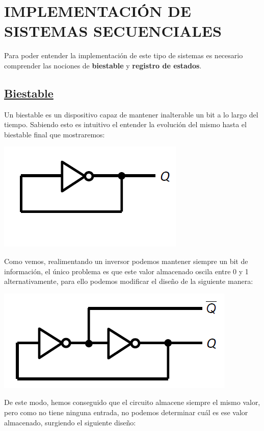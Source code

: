 \documentclass[a4paper,10pt]{book}
\begin{document}
\section*{IMPLEMENTACIÓN DE SISTEMAS SECUENCIALES}
Para poder entender la implementación de este tipo de sistemas es necesario comprender las nociones de \textbf{biestable} y \textbf{registro de estados}.

\subsection*{\underline{Biestable}}
Un biestable es un dispositivo capaz de mantener inalterable un bit a lo largo del tiempo. Sabiendo esto es intuitivo el entender la evolución del mismo hasta el biestable final que mostraremos:

\begin{center}
\includegraphics[scale=0.5]{evolucion1}
\end{center}

Como vemos, realimentando un inversor podemos mantener siempre un bit de información, el único problema es que este valor almacenado oscila entre 0 y 1 alternativamente, para ello podemos modificar el diseño de la siguiente manera:

\begin{center}
\includegraphics[scale=0.5]{evolucion2}
\end{center}

De este modo, hemos conseguido que el circuito almacene siempre el mismo valor, pero como no tiene ninguna entrada, no podemos determinar cuál es ese valor almacenado, surgiendo el siguiente diseño:
\end{document}

